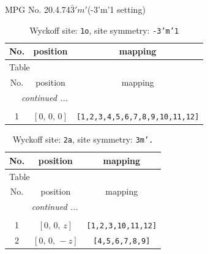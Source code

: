 \documentclass[fleqn,8pt]{jsarticle}
\begin{document}
\setcounter{MaxMatrixCols}{32}

\renewcommand{\tablename}{Table~}
\renewcommand{\figurename}{Figure~}
\begin{center}
\LARGE
MPG No. 20.4.74\quad$\bar{3}'m'$\quad(-3'm'1 setting)
\end{center}
\renewcommand{\arraystretch}{1.2}
\begin{longtable}{ccc}
\caption{Wyckoff site: {\tt 1o}, site symmetry: {\tt -3'm'1}}
 \\
 \hline \hline
No. & position & mapping \\ \hline \endfirsthead

\multicolumn{2}{l}{\tablename\ \thetable{}} \\
 \hline \hline
No. & position & mapping \\ \hline \endhead

 \hline \hline
\multicolumn{2}{r}{\footnotesize\it continued ...} \\ \endfoot

 \hline \hline
\multicolumn{2}{r}{} \\ \endlastfoot

1 & $\left[ 0,\, 0,\, 0 \right]$ & {\tt [1,2,3,4,5,6,7,8,9,10,11,12]} \\
\end{longtable}
\renewcommand{\arraystretch}{1.2}
\begin{longtable}{ccc}
\caption{Wyckoff site: {\tt 2a}, site symmetry: {\tt 3m'.}}
 \\
 \hline \hline
No. & position & mapping \\ \hline \endfirsthead

\multicolumn{2}{l}{\tablename\ \thetable{}} \\
 \hline \hline
No. & position & mapping \\ \hline \endhead

 \hline \hline
\multicolumn{2}{r}{\footnotesize\it continued ...} \\ \endfoot

 \hline \hline
\multicolumn{2}{r}{} \\ \endlastfoot

1 & $\left[ 0,\, 0,\, z \right]$ & {\tt [1,2,3,10,11,12]} \\ \hline
2 & $\left[ 0,\, 0,\, - z \right]$ & {\tt [4,5,6,7,8,9]} \\
\end{longtable}
\renewcommand{\arraystretch}{1.2}
\end{document}
